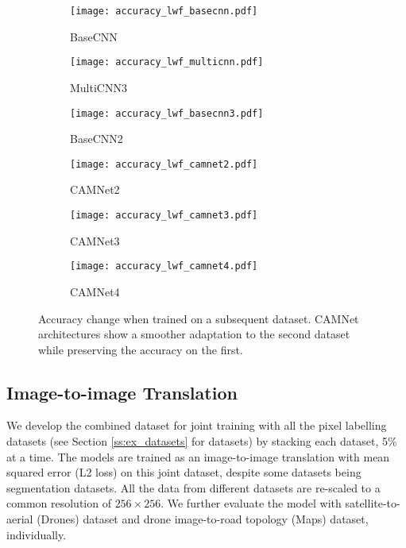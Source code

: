 \documentclass[10pt,twocolumn,letterpaper]{article}
\begin{document}
\begin{figure}[ht]
	\begin{center}
		\begin{subfigure}[b]{0.32\columnwidth}
			\texttt{[image: accuracy\_lwf\_basecnn.pdf]}
			\caption{BaseCNN}
		\end{subfigure}
		\begin{subfigure}[b]{0.32\columnwidth}
			\texttt{[image: accuracy\_lwf\_multicnn.pdf]}
			\caption{MultiCNN3}
		\end{subfigure}
		\begin{subfigure}[b]{0.32\columnwidth}
			\texttt{[image: accuracy\_lwf\_basecnn3.pdf]}
			\caption{BaseCNN2}
		\end{subfigure}
		\begin{subfigure}[b]{0.32\columnwidth}
			\texttt{[image: accuracy\_lwf\_camnet2.pdf]}
			\caption{CAMNet2}
		\end{subfigure}
		\begin{subfigure}[b]{0.32\columnwidth}
			\texttt{[image: accuracy\_lwf\_camnet3.pdf]}
			\caption{CAMNet3}
		\end{subfigure}
		\begin{subfigure}[b]{0.32\columnwidth}
			\texttt{[image: accuracy\_lwf\_camnet4.pdf]}
			\caption{CAMNet4}
		\end{subfigure}
	\end{center}
	\vspace{-0.2in}
	\caption{Accuracy change when trained on a subsequent dataset. CAMNet architectures show a smoother adaptation to the second dataset while preserving the accuracy on the first.}
	\label{fig:learning_curve}
	\vspace{-0.1in}
\end{figure}

\subsection{Image-to-image Translation}
\label{ss:im_to_im}
\vspace{-0.05in}
We develop the combined dataset for joint training with all the pixel labelling datasets (see Section \ref{ss:ex_datasets} for datasets) by stacking each dataset, 5\% at a time. The models are trained as an image-to-image translation with mean squared error (L2 loss) on this joint dataset, despite some datasets being segmentation datasets. All the data from different datasets are re-scaled to a common resolution of $256\times256$. We further evaluate the model with satellite-to-aerial (Drones) dataset and drone image-to-road topology (Maps) dataset, individually.
\end{document}
